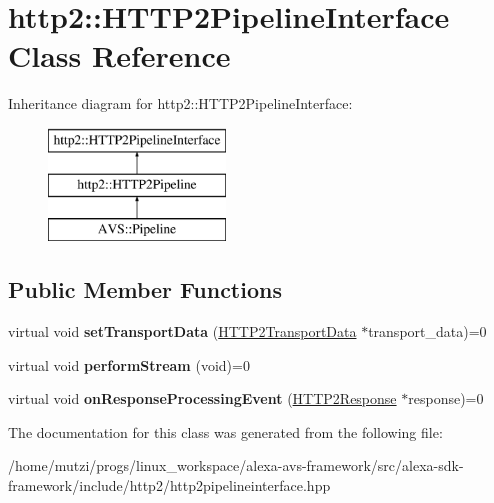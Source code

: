 \hypertarget{classhttp2_1_1HTTP2PipelineInterface}{}\section{http2\+:\+:H\+T\+T\+P2\+Pipeline\+Interface Class Reference}
\label{classhttp2_1_1HTTP2PipelineInterface}
Inheritance diagram for http2\+:\+:H\+T\+T\+P2\+Pipeline\+Interface\+:\begin{figure}[H]
\begin{center}
\leavevmode
\includegraphics[height=3.000000cm]{d9/d50/classhttp2_1_1HTTP2PipelineInterface}
\end{center}
\end{figure}
\subsection*{Public Member Functions}
\begin{DoxyCompactItemize}
\item 
\mbox{\label{classhttp2_1_1HTTP2PipelineInterface_a5261db2a2fc05726d2d8be2f820cc94d}} 
virtual void {\bfseries set\+Transport\+Data} (\hyperlink{classhttp2_1_1HTTP2TransportData}{H\+T\+T\+P2\+Transport\+Data} $\ast$transport\+\_\+data)=0
\item 
\mbox{\label{classhttp2_1_1HTTP2PipelineInterface_a7d843e4ef2f20de0e5cae570d7041d5b}} 
virtual void {\bfseries perform\+Stream} (void)=0
\item 
\mbox{\label{classhttp2_1_1HTTP2PipelineInterface_a7ace03762d9ec5826911be2e7fe078fd}} 
virtual void {\bfseries on\+Response\+Processing\+Event} (\hyperlink{classhttp2_1_1HTTP2Response}{H\+T\+T\+P2\+Response} $\ast$response)=0
\end{DoxyCompactItemize}


The documentation for this class was generated from the following file\+:\begin{DoxyCompactItemize}
\item 
/home/mutzi/progs/linux\+\_\+workspace/alexa-\/avs-\/framework/src/alexa-\/sdk-\/framework/include/http2/http2pipelineinterface.\+hpp\end{DoxyCompactItemize}
